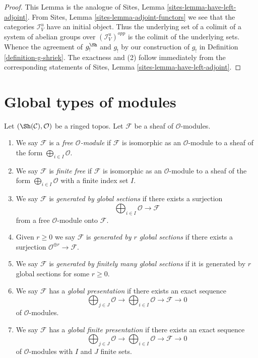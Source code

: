 \begin{proof}
This Lemma is the analogue of
Sites, Lemma \ref{sites-lemma-have-left-adjoint}.
From Sites, Lemma \ref{sites-lemma-adjoint-functors} we see that the categories
$\mathcal{I}_V^u$ have an initial object. Thus the underlying set of a
colimit of a system of abelian groups over $(\mathcal{I}_V^u)^{opp}$
is the colimit of the underlying sets. Whence the agreement
of $g_!^{\Sh}$ and $g_!$ by our construction of $g_!$ in
Definition \ref{definition-g-shriek}.
The exactness and (2) follow immediately from the corresponding statements of
Sites, Lemma \ref{sites-lemma-have-left-adjoint}.
\end{proof}





\section{Global types of modules}
\label{section-global}

\begin{definition}
\label{definition-global}
Let $(\Sh(\mathcal{C}), \mathcal{O})$ be a ringed topos.
Let $\mathcal{F}$ be a sheaf of $\mathcal{O}$-modules.
\begin{enumerate}
\item We say $\mathcal{F}$ is a {\it free $\mathcal{O}$-module}
if $\mathcal{F}$ is isomorphic as an $\mathcal{O}$-module
to a sheaf of the form $\bigoplus_{i \in I} \mathcal{O}$.
\item We say $\mathcal{F}$ is {\it finite free} if
$\mathcal{F}$ is isomorphic as an $\mathcal{O}$-module
to a sheaf of the form $\bigoplus_{i \in I} \mathcal{O}$
with a finite index set $I$.
\item We say $\mathcal{F}$ is {\it generated by global sections}
if there exists a surjection
$$
\bigoplus\nolimits_{i \in I} \mathcal{O} \longrightarrow \mathcal{F}
$$
from a free $\mathcal{O}$-module onto $\mathcal{F}$.
\item Given $r \geq 0$ we say $\mathcal{F}$ is
{\it generated by $r$ global sections} if there exists a surjection
$\mathcal{O}^{\oplus r} \to \mathcal{F}$.
\item We say $\mathcal{F}$ is {\it generated by finitely many global sections}
if it is generated by $r$ global sections for some $r \geq 0$.
\item We say $\mathcal{F}$ has a {\it global presentation}
if there exists an exact sequence
$$
\bigoplus\nolimits_{j \in J} \mathcal{O} \longrightarrow
\bigoplus\nolimits_{i \in I} \mathcal{O} \longrightarrow
\mathcal{F} \longrightarrow 0
$$
of $\mathcal{O}$-modules.
\item We say $\mathcal{F}$ has a {\it global finite presentation}
if there exists an exact sequence
$$
\bigoplus\nolimits_{j \in J} \mathcal{O} \longrightarrow
\bigoplus\nolimits_{i \in I} \mathcal{O} \longrightarrow
\mathcal{F} \longrightarrow 0
$$
of $\mathcal{O}$-modules with $I$ and $J$ finite sets.
\end{enumerate}
\end{definition}

